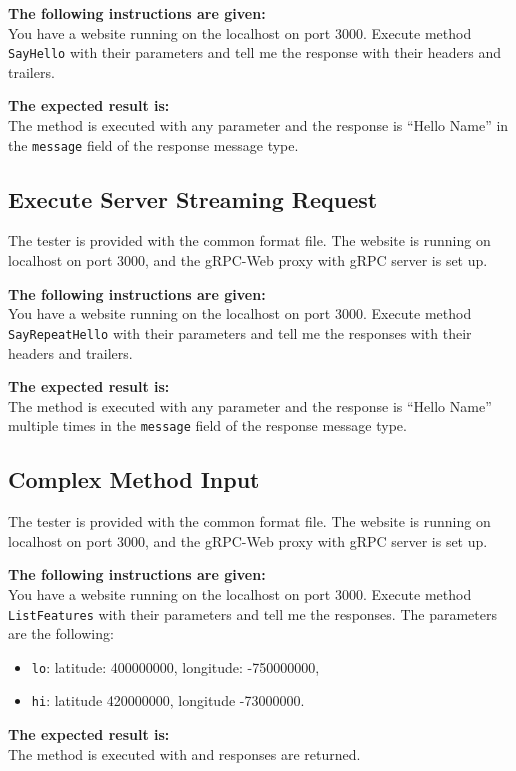 \textbf{The following instructions are given:}\\
You have a website running on the localhost on port 3000.
Execute method \texttt{SayHello} with their parameters and tell me the response with their headers and trailers.

\textbf{The expected result is:}\\
The method is executed with any parameter
and the response is \enquote{Hello Name} in the \texttt{message} field of the response message type.

\subsection{Execute Server Streaming Request}
The tester is provided with the common format file.
The website is running on localhost on port 3000, and the gRPC-Web proxy with gRPC server is set up.

\textbf{The following instructions are given:}\\
You have a website running on the localhost on port 3000.
Execute method \texttt{SayRepeatHello} with their parameters and tell me the responses with their headers and trailers.

\textbf{The expected result is:}\\
The method is executed with any parameter
and the response is \enquote{Hello Name} multiple times in the \texttt{message} field of the response message type.

\subsection{Complex Method Input}
The tester is provided with the common format file.
The website is running on localhost on port 3000, and the gRPC-Web proxy with gRPC server is set up.

\textbf{The following instructions are given:}\\
You have a website running on the localhost on port 3000.
Execute method \texttt{ListFeatures} with their parameters and tell me the responses.
The parameters are the following:
\begin{itemize}
    \item \texttt{lo}: latitude: 400000000, longitude: -750000000,
    \item \texttt{hi}: latitude 420000000, longitude -73000000.
\end{itemize}

\textbf{The expected result is:}\\
The method is executed with and responses are returned.

